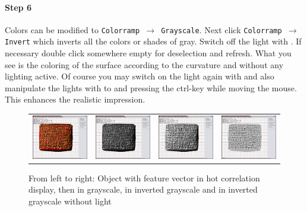 \paragraph*{Step 6}
Colors can be modified to \texttt{Colorramp $\rightarrow$ Grayscale}. Next click \texttt{Colorramp $\rightarrow$ Invert} which inverts all the colors or shades of gray. Switch off the light with \!. If necessary double click somewhere empty for deselection and refresh. What you see is the coloring of the surface according to the curvature and without any lighting active. Of course you may switch on the light again with  and also manipulate the lights  with   to   and pressing the ctrl-key while moving the mouse. This enhances the realistic impression.
\begin{figure}[H]
 \centering
 \begin{tabular}{cccc}
  \includegraphics[width=3cm]{figs/featvecthotcorr} & \includegraphics[width=3cm]{figs/featvectgrayscale} & \includegraphics[width=3cm]{figs/featvectgrayscaleinverted}
  & \includegraphics[width=3cm]{figs/featvectgrayscaleinvertedwolight}
 \end{tabular}
  \caption{From left to right: Object with feature vector in hot correlation display, then in grayscale, in inverted grayscale and in inverted grayscale without light}
\end{figure}

